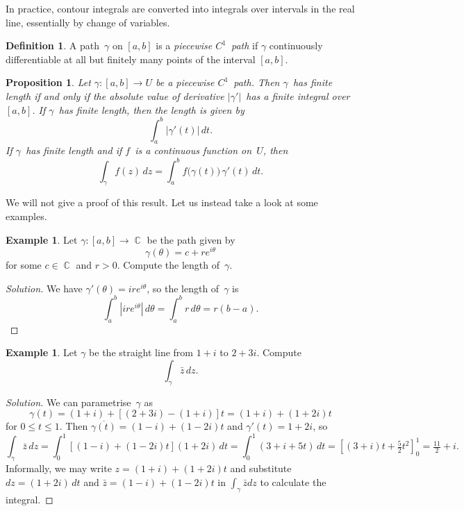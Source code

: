 \documentclass{amsproc}
\newtheorem{proposition}[theorem]{Proposition}
\theoremstyle{definition}
\newtheorem{definition}[theorem]{Definition}
\newtheorem{example}[theorem]{Example}
\newenvironment{solution}{\begin{proof}[Solution]}{\end{proof}}
\theoremstyle{remark}
\DeclareMathOperator{\C}{\mathbb{C}}
\numberwithin{equation}{section}
\begin{document}
In practice, contour integrals are converted into integrals over intervals in the real line, essentially by change of variables.

\begin{definition} \label{CMD6.4}
A path~$ \gamma $ on $ [a,b] $ is a \emph{piecewise $ C^1 $~path} if $ \gamma $ continuously differentiable at all but finitely many points of the interval $ [a,b] $.
\end{definition}

\begin{proposition} \label{CMP6.5}
Let $ \gamma: [a,b] \to U $ be a piecewise $ C^1 $~path. Then $ \gamma $~has finite length if and only if the absolute value of derivative $ |\gamma'| $~has a finite integral
over $ [a,b] $. If $ \gamma $~has finite length, then the length is given by
$$
\int_a^b |\gamma'(t)|\,dt.
$$
If $ \gamma $~has finite length and if $ f $~is a continuous function on~$ U $, then
$$
\int_\gamma f(z)\,dz = \int_a^b f\bigl(\gamma(t)\bigr)\,\gamma'(t)\,dt.
$$
\end{proposition}

We will not give a proof of this result. Let us instead take a look at some examples.

\begin{example} \label{CME6.6}
Let $ \gamma: [a,b] \to \C $ be the path given by
$$
\gamma(\theta) = c + re^{i\theta}
$$
for some $ c \in \C $ and $ r > 0 $. Compute the length of~$ \gamma $.
\end{example}

\begin{solution}
We have $ \gamma'(\theta) = ire^{i\theta} $, so the length of~$ \gamma $ is
$$
\int_a^b |i re^{i\theta}|\,d\theta = \int_a^b r\,d\theta = r(b - a).
$$
\end{solution}

\begin{example} \label{CME6.7}
Let $ \gamma $ be the straight line from $ 1 + i $ to $ 2 + 3i $. Compute
$$
\int_\gamma \bar{z}\,dz.
$$
\end{example}

\begin{solution}
We can parametrise~$ \gamma $ as
$$
\gamma(t) = (1 + i) + [(2 + 3i) - (1 + i)]t = (1 + i) + (1 + 2i)t
$$
for $ 0 \leq t \leq 1 $. Then $ \overline{\gamma(t)} = (1 - i) + (1 - 2i)t $ and $ \gamma'(t) = 1 + 2i $, so
$$
\int_\gamma \bar{z}\,dz = \int_0^1 [(1 - i) + (1 - 2i)t](1 + 2i)\,dt
= \int_0^1 (3 + i + 5t)\,dt
= [(3 + i)t + \tfrac{5}{2}t^2]_0^1
= \tfrac{11}{2} + i.
$$
Informally, we may write $ z = (1 + i) + (1 + 2i)t $ and substitute $ dz = (1 + 2i)\,dt $ and $ \bar{z} = (1 - i) + (1 - 2i)t $ in $ \int_\gamma \bar{z} dz $
to calculate the integral.
\end{solution}
\end{document}
